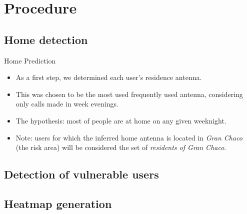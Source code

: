 
\section{Procedure}
\subsection{Home detection}
	\begin{block}{Home Prediction}
		\begin{itemize}
			\item As a first step, we determined each user's residence antenna.
			
			\item This was chosen to be the most used frequently used antenna, considering only calls made in week evenings.
			
			\item The hypothesis: most of people are at home on any given weeknight. 
			
			\item Note: users for which the inferred home antenna is located in \textit{Gran Chaco} (the risk area) will
			be considered the set of \textit{residents of Gran Chaco}. 
			
		\end{itemize}
	\end{block}

\subsection{Detection of vulnerable users}
\subsection{Heatmap generation}